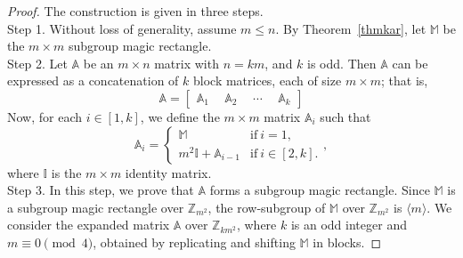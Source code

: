 \documentclass[10pt,a4paper]{amsart}
\begin{document}
\begin{proof}
    The construction is given in three steps. 
    \\
    \noindent Step 1. Without loss of generality, assume $m \leq n$. By Theorem~\ref{thmkar},  let $\mathbb{M}$ be the $m \times m$ subgroup magic rectangle.\\
    \noindent Step 2. Let $\mathbb{A}$ be an $m \times n$ matrix with $n = km$, and $k$ is odd. 
Then $\mathbb{A}$ can be expressed as a concatenation of $k$ block matrices, each of size $m \times m$; that is,
\[
\mathbb{A} = \begin{bmatrix} 
\mathbb{A}_1 ~~& \mathbb{A}_2 ~~& \cdots & ~~\mathbb{A}_k
\end{bmatrix}
\]
Now, for each $i\in [1,k]$, we define the $m\times m$ matrix $\mathbb{A}_i$ such that \[\mathbb{A}_i=\begin{cases}
    \mathbb{M} & \text{if} ~i=1, \\
    m^2\mathbb{I}+ \mathbb{A}_{i-1} & \text{if}~ i \in [2,k].\end{cases},\]
where $\mathbb{I}$ is the $m\times m$ identity matrix.\\
\noindent Step 3. In this step, we prove that $\mathbb{A}$ forms a subgroup magic rectangle. Since $\mathbb{M}$ is a subgroup magic rectangle over $\mathbb{Z}_{m^2}$, the row-subgroup of $\mathbb{M}$ over $\mathbb{Z}_{m^2}$ is $\langle m\rangle$. We consider the expanded matrix $\mathbb{A}$ over $\mathbb{Z}_{k m^2}$, where $k$ is an odd integer and $m \equiv 0 \pmod{4}$, obtained by replicating and shifting $\mathbb{M}$ in blocks.


\end{proof}
\end{document}
